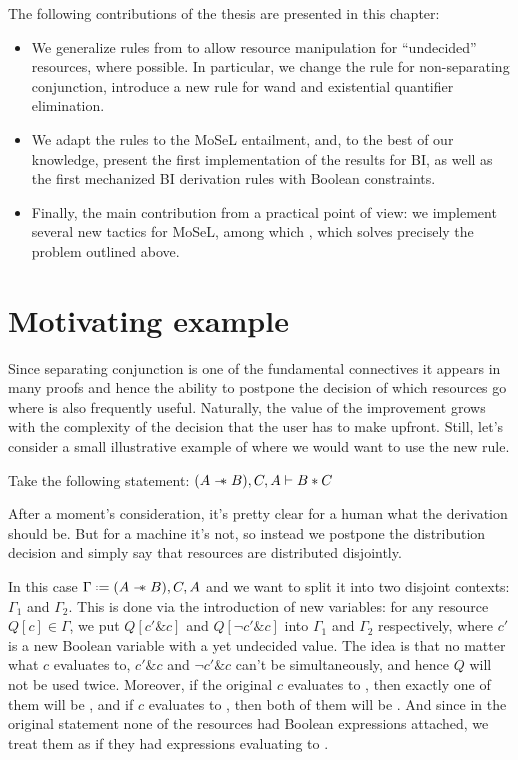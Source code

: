 The following contributions of the thesis are presented in this chapter:
\begin{itemize}
\item We generalize rules from \citet{harlandResourceDistributionBooleanConstraints2003} to allow resource manipulation for ``undecided'' resources, where possible.
  In particular, we change the rule for non-separating conjunction, introduce a new rule for wand and existential quantifier elimination.
\item We adapt the rules to the MoSeL entailment, and, to the best of our knowledge, present the first implementation of the results for BI, as well as the first mechanized BI derivation rules with Boolean constraints.
\item Finally, the main contribution from a practical point of view: we implement several new tactics for MoSeL, among which , which solves precisely the problem outlined above.
\end{itemize}

\section{Motivating example}

Since separating conjunction is one of the fundamental connectives it appears in many proofs and hence the ability to postpone the decision of which resources go where is also frequently useful.
Naturally, the value of the improvement grows with the complexity of the decision that the user has to make upfront.
Still, let's consider a small illustrative example of where we would want to use the new rule.

Take the following statement:
\((A \mathrel{-\mkern-6mu*} B), C, A \vdash B * C\)

After a moment's consideration, it's pretty clear for a human what the derivation should be.
But for a machine it's not, so instead we postpone the distribution decision and simply say that resources are distributed disjointly.

In this case \(\Gamma \defeq (A \wand B), C, A\) and we want to split it into two disjoint contexts: \(\Gamma_1\) and \(\Gamma_2\).
This is done via the introduction of new variables:
for any resource \(Q[c] \in \Gamma\), we put \(Q[c' \& c]\) and \(Q[\neg c' \& c]\) into \(\Gamma_1\) and \(\Gamma_2\) respectively, where \(c'\) is a new Boolean variable with a yet undecided value.
The idea is that no matter what \(c\) evaluates to, \(c' \& c\) and \(\neg c' \& c\) can't be \true simultaneously, and hence \(Q\) will not be used twice.
Moreover, if the original \(c\) evaluates to \true, then exactly one of them will be \true, and if \(c\) evaluates to \false, then both of them will be \false.
And since in the original statement none of the resources had Boolean expressions attached, we treat them as if they had expressions evaluating to \true.

